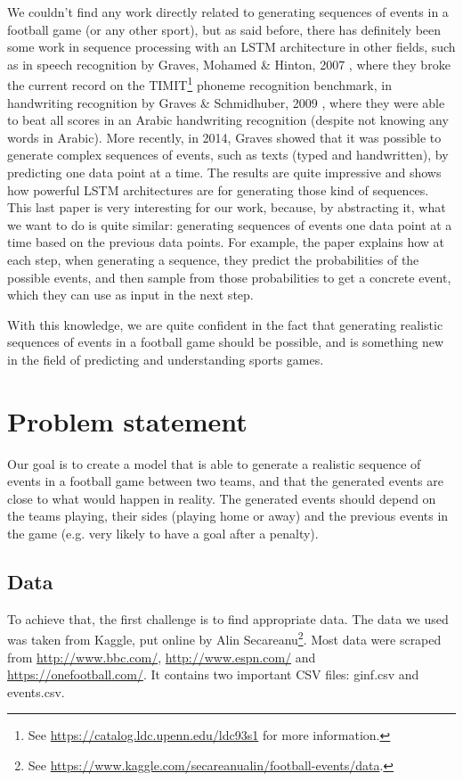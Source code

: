 \documentclass[10pt,conference,onecolumn]{IEEEtran}
\begin{document}
We couldn't find any work directly related to generating sequences of events in a football game (or any other sport), but as said before, there has definitely been some work in sequence processing with an LSTM architecture in other fields, such as in speech recognition by Graves, Mohamed \& Hinton, 2007 \cite{speech_recognition}, where they broke the current record on the TIMIT\footnote{See \url{https://catalog.ldc.upenn.edu/ldc93s1} for more information.} phoneme recognition benchmark, in handwriting recognition by Graves \& Schmidhuber, 2009 \cite{NIPS2008/handwriting_recognition}, where they were able to beat all scores in an Arabic handwriting recognition (despite not knowing any words in Arabic). More recently, in 2014, Graves \cite{generate_events_lstm} showed that it was possible to generate complex sequences of events, such as texts (typed and handwritten), by predicting one data point at a time. The results are quite impressive and shows how powerful LSTM architectures are for generating those kind of sequences. This last paper is very interesting for our work, because, by abstracting it, what we want to do is quite similar: generating sequences of events one data point at a time based on the previous data points. For example, the paper explains how at each step, when generating a sequence, they predict the probabilities of the possible events, and then sample from those probabilities to get a concrete event, which they can use as input in the next step.

With this knowledge, we are quite confident in the fact that generating realistic sequences of events in a football game should be possible, and is something new in the field of predicting and understanding sports games.

\section{Problem statement} \label{sec:problem_statement}
Our goal is to create a model that is able to generate a realistic sequence of events in a football game between two teams, and that the generated events are close to what would happen in reality. The generated events should depend on the teams playing, their sides (playing home or away) and the previous events in the game (e.g. very likely to have a goal after a penalty).

\subsection{Data}
To achieve that, the first challenge is to find appropriate data. The data we used was taken from Kaggle, put online by Alin Secareanu\footnote{See \url{https://www.kaggle.com/secareanualin/football-events/data}.}. Most data were scraped from \url{http://www.bbc.com/}, \url{http://www.espn.com/} and \url{https://onefootball.com/}. It contains two important CSV files: ginf.csv and events.csv.
\end{document}
